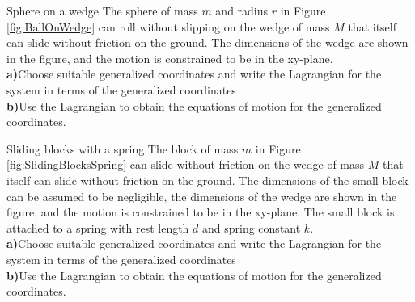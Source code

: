 \begin{problem}{Sphere on a wedge}
The sphere of mass $m$ and radius $r$ in Figure \ref{fig:BallOnWedge} can roll without slipping on the wedge of mass $M$ that itself can slide without friction on the ground. The dimensions of the wedge are shown in the figure, and the motion is constrained to be in the xy-plane.
\\
\textbf{a)}Choose suitable generalized coordinates and write the Lagrangian for the system in terms of the generalized coordinates\\
\textbf{b)}Use the Lagrangian to obtain the equations of motion for the generalized coordinates.
\label{prob_Lagrange_10}
\end{problem}

\begin{problem}{Sliding blocks with a spring}
The block of mass $m$ in Figure \ref{fig:SlidingBlocksSpring} can slide without friction on the wedge of mass $M$ that itself can slide without friction on the ground. The dimensions of the small block can be assumed to be negligible, the dimensions of the wedge are shown in the figure, and the motion is constrained to be in the xy-plane. The small block is attached to a spring with rest length $d$ and spring constant $k$.
\\
\textbf{a)}Choose suitable generalized coordinates and write the Lagrangian for the system in terms of the generalized coordinates\\
\textbf{b)}Use the Lagrangian to obtain the equations of motion for the generalized coordinates.
\label{prob_Lagrange_11}
\end{problem}

